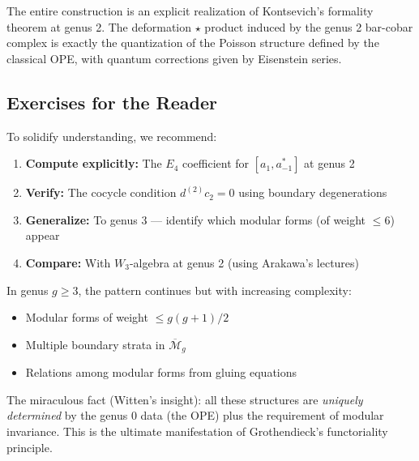 \begin{remark}
The entire construction is an explicit realization of Kontsevich's formality theorem
at genus 2. The deformation $\star$ product induced by the genus 2 bar-cobar complex
is exactly the quantization of the Poisson structure defined by the classical OPE,
with quantum corrections given by Eisenstein series.
\end{remark}

\subsection{Exercises for the Reader}

To solidify understanding, we recommend:

\begin{enumerate}
\item \textbf{Compute explicitly:} The $E_4$ coefficient for $[a_1, a^*_{-1}]$ at genus 2

\item \textbf{Verify:} The cocycle condition $d^{(2)} c_2 = 0$ using boundary degenerations

\item \textbf{Generalize:} To genus 3 --- identify which modular forms (of weight $\leq 6$) appear

\item \textbf{Compare:} With $W_3$-algebra at genus 2 (using Arakawa's lectures)
\end{enumerate}

\begin{remark}
In genus $g \geq 3$, the pattern continues but with increasing complexity:
\begin{itemize}
\item Modular forms of weight $\leq g(g+1)/2$
\item Multiple boundary strata in $\overline{\mathcal{M}}_g$
\item Relations among modular forms from gluing equations
\end{itemize}

The miraculous fact (Witten's insight): all these structures are \emph{uniquely determined}
by the genus 0 data (the OPE) plus the requirement of modular invariance. This is the
ultimate manifestation of Grothendieck's functoriality principle.
\end{remark}